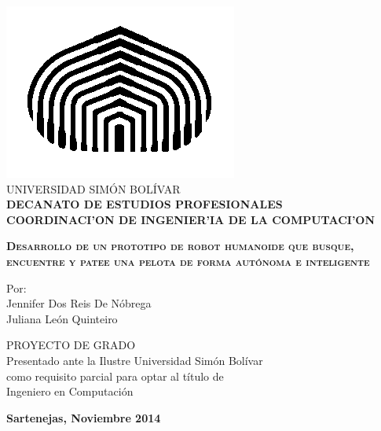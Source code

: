 \begin{titlepage}
\begin{center}

\includegraphics[scale=0.5,type=png,ext=.png,read=.png]{imagenes/cebolla} \\

\textsc {\large UNIVERSIDAD SIMÓN BOLÍVAR} \\
\textsc{\bfseries DECANATO DE ESTUDIOS PROFESIONALES\\
COORDINACI'ON DE INGENIER'IA DE LA COMPUTACI'ON}

\bigskip
\bigskip
\bigskip
\bigskip
\bigskip
\bigskip
\bigskip
\bigskip
\bigskip

\textsc{\bfseries Desarrollo de un prototipo de robot humanoide que busque, encuentre y patee una pelota de forma autónoma e inteligente}

\bigskip
\bigskip
\bigskip
\bigskip
\bigskip

\begin{minipage}{\textwidth}
\centering
Por: \\
Jennifer Dos Reis De Nóbrega \\ Juliana Le\'on Quinteiro\\

\bigskip
\bigskip
\bigskip

\end{minipage}

\bigskip
\bigskip
\bigskip
\bigskip
\bigskip
\bigskip
\bigskip
\bigskip
\bigskip

{PROYECTO DE GRADO \\ Presentado ante la Ilustre Universidad Simón Bolívar \\
como requisito parcial para optar al título de \\ Ingeniero en Computación} \\

\bigskip
\bigskip
\vfill

{\large \bfseries Sartenejas, 
Noviembre 2014}

\end{center}
\end{titlepage}
